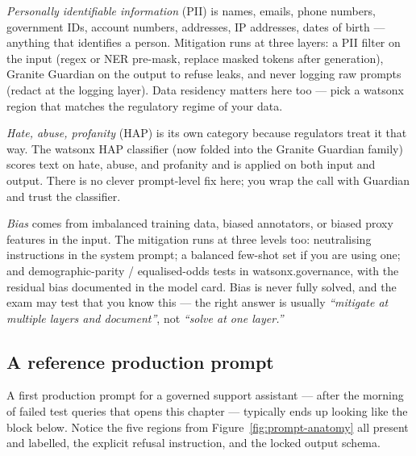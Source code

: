 \emph{Personally identifiable information} (PII) is names, emails, phone numbers, government IDs, account numbers, addresses, IP addresses, dates of birth --- anything that identifies a person. Mitigation runs at three layers: a PII filter on the input (regex or NER pre-mask, replace masked tokens after generation), Granite Guardian on the output to refuse leaks, and never logging raw prompts (redact at the logging layer). Data residency matters here too --- pick a watsonx region that matches the regulatory regime of your data.

\emph{Hate, abuse, profanity} (HAP) is its own category because regulators treat it that way. The watsonx HAP classifier (now folded into the Granite Guardian family) scores text on hate, abuse, and profanity and is applied on both input and output. There is no clever prompt-level fix here; you wrap the call with Guardian and trust the classifier.

\emph{Bias} comes from imbalanced training data, biased annotators, or biased proxy features in the input. The mitigation runs at three levels too: neutralising instructions in the system prompt; a balanced few-shot set if you are using one; and demographic-parity / equalised-odds tests in watsonx.governance, with the residual bias documented in the model card. Bias is never fully solved, and the exam may test that you know this --- the right answer is usually \emph{``mitigate at multiple layers and document''}, not \emph{``solve at one layer.''}


\subsection{A reference production prompt}

A first production prompt for a governed support assistant --- after the morning of failed test queries that opens this chapter --- typically ends up looking like the block below. Notice the five regions from Figure~\ref{fig:prompt-anatomy} all present and labelled, the explicit refusal instruction, and the locked output schema.

